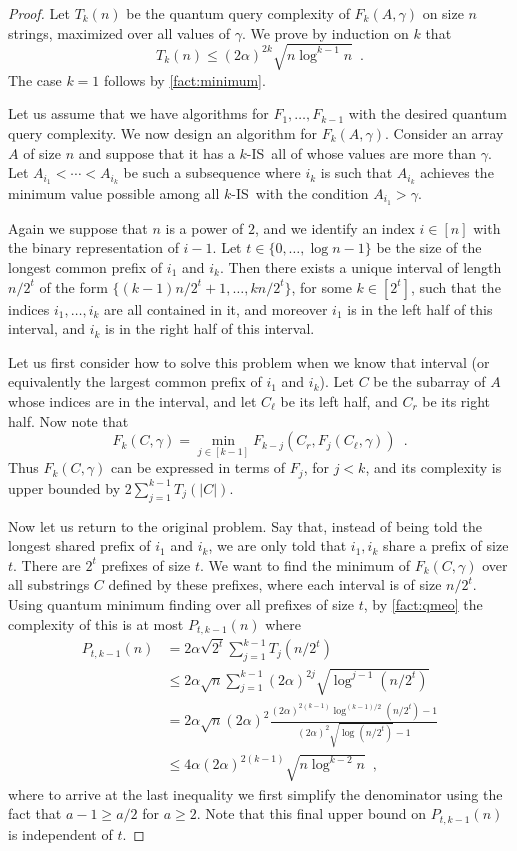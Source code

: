 \documentclass[12pt]{article}
\newcommand{\IS}{\textsc{IS}}
\theoremstyle{definition}
\begin{document}
\begin{proof}
Let $T_{k}(n)$ be the quantum query complexity of $F_k(A, \gamma)$ on size $n$ strings, maximized over all values of $\gamma$. 
We prove by induction on $k$ that 
\[
T_{k}(n) \le (2\alpha)^{2k} \sqrt{n \log^{k-1} n} \enspace.
\]
The case $k=1$ follows by \cref{fact:minimum}.

Let us assume that we have algorithms for $F_1, \ldots, F_{k-1}$ with the desired quantum query complexity. 
We now design an algorithm for $F_k(A, \gamma)$. 
Consider an array $A$ of size $n$ and suppose that it has a $k$-\IS \ all of whose values are more than $\gamma$.
Let $A_{i_1} <  \cdots < A_{i_k}$ be such a subsequence where $i_k$ is such that $A_{i_k}$ achieves the minimum value possible 
among all $k$-\IS\  with the condition $A_{i_1} > \gamma$. 

Again we suppose that $n$ is a power of $2$, and we identify an index $i \in [n]$ with the binary representation of $i -1$.
Let $t \in \{0, \ldots, \log n-1\}$ be the size of the longest common prefix of $i_1$ and $i_k$. Then there exists a unique interval of length $n/2^t$ of the form $\{(k-1)n/2^t+1, \ldots ,  kn/2^t\}$, for some $k \in [2^t]$, such that the indices $i_1 , \ldots , i_k$ are all contained in it, and moreover $i_1$ is in the left half of this interval, and $i_k$ is in the right half of this interval.  

Let us first consider how to solve this problem when we know that interval
(or equivalently the largest common prefix of $i_1$ and $i_k$).
Let $C$ be the subarray of $A$ whose indices are in the interval, and let $C_\ell$ be its left half, and $C_r$ be its right half.  
Now note that 
\[
F_k(C, \gamma) = 
\min_{j \in [k-1]} F_{k-j}(C_r, F_j(C_\ell, \gamma))
\enspace .
\]
Thus $F_k(C,\gamma)$ can be expressed in terms of $F_j$, for $j < k$, and its complexity is upper bounded by $2\sum_{j=1}^{k-1} T_{ j}(|C|)$.   

Now let us return to the original problem. Say that, instead of being told the longest shared prefix of $i_1$ and $i_k$, we are only told that $i_1, i_k$ share a prefix of size $t$.  
There are $2^t$ prefixes of size $t$. We want to find the minimum of $F_k(C,\gamma)$ over all substrings $C$ defined by these prefixes, where each interval is of size $n/2^t$.  Using quantum minimum  finding over all prefixes of size $t$, by \cref{fact:qmeo} the complexity of this is at most $P_{t, k-1}(n)$ where
\begin{align*}
P_{t,k-1}(n) &= 
2 \alpha \sqrt{2^t} \sum_{j=1 }^{k-1} T_{ j} (n/2^{t}) \\
&\le 2 \alpha \sqrt{n} \sum_{j=1}^{k-1} (2\alpha)^{2j} \sqrt{\log^{j-1} (n/2^t)} \\
&= 2\alpha \sqrt{n} (2\alpha)^2 \frac{(2\alpha)^{2(k-1)} 
\log^{(k-1)/2} (n/2^t)-1}{(2\alpha)^2 \sqrt{\log (n/2^t)} - 1} \\
&\le 4 \alpha (2\alpha)^{2(k-1)} \sqrt{n \log^{k-2} n}
\enspace ,
\end{align*}
where to arrive at the last inequality we first simplify the denominator using the fact that $a-1 \ge a/2$ for $a \ge 2.$
Note that this final upper bound on $P_{t, k-1}(n)$ is independent of $t$.


\end{proof}
\end{document}
